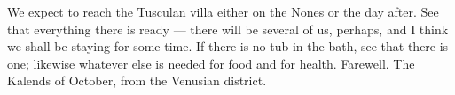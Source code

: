 

We expect to reach the Tusculan villa either on the Nones or the day after. See that everything there is ready --- there will be several of us, perhaps, and I think we shall be staying for some time. If there is no tub in the bath, see that there is one; likewise whatever else is needed for food and for health. Farewell. The Kalends of October, from the Venusian district.
